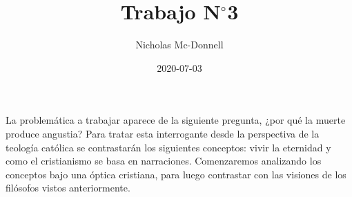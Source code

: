 \documentclass{homework}
\title{Trabajo N$^{\circ}$3}
\date{2020-07-03}
\author{Nicholas Mc-Donnell}
\begin{document}
\maketitle
%
% 
%
%
La problemática a trabajar aparece de la siguiente pregunta, ¿por qué la muerte produce angustia? Para tratar esta interrogante desde la perspectiva de la teología católica se contrastarán los siguientes conceptos: vivir la eternidad y como el cristianismo se basa en narraciones. Comenzaremos analizando los conceptos bajo una óptica cristiana, para luego contrastar con las visiones de los filósofos vistos anteriormente.
\end{document}
